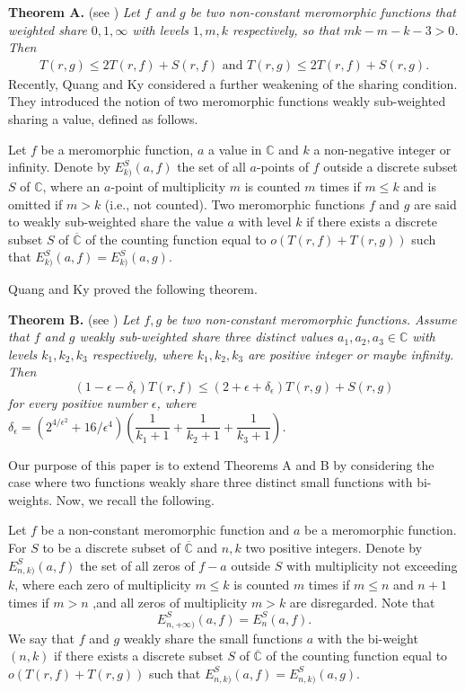 \documentclass[12pt,leqno]{amsart}
\newcommand{\C}{{\mathbb{C}}}
\numberwithin{equation}{section}
\begin{document}
\vskip0.2cm
\noindent
{\bf Theorem A.} (see \cite{L}) \textit{Let $f$ and $g$ be two non-constant meromorphic functions that weighted share $0,1,\infty$ with levels $1,m,k$ respectively, so that $mk-m-k-3>0$. Then
\begin{align*}
     T(r, g) \le 2T(r,f)+S(r,f) \text{ and } T(r,g) \le 2T(r,f)+S(r,g).
\end{align*}}
\indent
Recently, Quang and Ky considered a further weakening of the sharing condition. They introduced the notion of two meromorphic functions weakly sub-weighted sharing a value, defined as follows.

Let $f$ be a meromorphic function, $a$ a value in $\C$ and $k$ a non-negative integer or infinity. Denote by $E^S_{k)}(a, f)$ the set of all $a$-points of $f$ outside a discrete subset $S$ of $\C$, where an $a$-point of multiplicity $m$ is counted $m$ times if $m \le k$ and is omitted if $m >k$ (i.e., not counted). Two meromorphic functions $f$ and $g$ are said to weakly sub-weighted share the value $a$ with level $k$ if there exists a discrete subset $S$ of $\overline\C$ of the counting function equal to $o(T(r,f)+T(r,g))$ such that $E_{k)}^{S}(a,f)=E_{k)}^{S}(a,g).$

Quang and Ky proved the following theorem.

\vskip0.2cm
\noindent
{\bf Theorem B.} (see \cite{QK}) \textit{Let $f, g$ be two non-constant meromorphic functions. Assume that $f$ and $g$ weakly sub-weighted share three distinct values $a_1,a_2,a_3\in\C$ with levels $k_1,k_2,k_3$ respectively, where $k_1, k_2, k_3$ are positive integer or maybe infinity. Then
$$(1-\epsilon-\delta_\epsilon)T(r, f)\le (2+\epsilon +\delta_\epsilon )T(r, g)+S(r, g)$$
for every positive number $\epsilon$, where $\delta_\epsilon=(2^{4/\epsilon^2}+16/\epsilon^4)\left(\dfrac{1}{k_1+1}+\dfrac{1}{k_2+1}+\dfrac{1}{k_3+1}\right)$.}

\vskip0.2cm
Our purpose of this paper is to extend Theorems A and B by considering the case where two functions weakly share three distinct small functions with bi-weights. Now, we recall the following.

Let $f$ be a non-constant meromorphic function and $a$ be a meromorphic function. For $S$ to be a discrete subset of $\overline\C$ and $n,k$ two positive integers. Denote by $E^{S}_{n,k)}(a,f)$ the set of all zeros of $f-a$ outside $S$ with multiplicity not exceeding $k$, where each zero of multiplicity $m\le k$ is counted $m$ times if $m\le n$ and $n+1$ times if $m>n$ ,and all zeros of multiplicity $m>k$ are disregarded. Note that 
$$E^S_{n,+\infty)}(a,f)=E^S_{n}(a,f).$$ 
We say that $f$ and $g$ weakly share the small functions $a$ with the bi-weight $(n,k)$ if there exists a discrete subset $S$ of $\overline\C$ of the counting function equal to $o(T(r,f)+T(r,g))$ such that $E^S_{n,k)}(a,f)=E^S_{n,k)}(a,g)$. 
\end{document}
